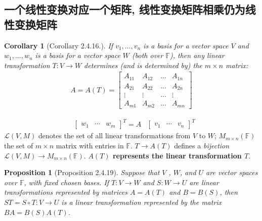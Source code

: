 \documentclass[11pt,a4paper]{article}
\newtheorem{proposition}{Proposition}
\newtheorem{corollary}{Corollary}
\begin{document}
\subsection{一个线性变换对应一个矩阵, 线性变换矩阵相乘仍为线性变换矩阵}
\begin{corollary}[Corollary 2.4.16.]
    If $v_1,...,v_n$ is a basis for a vector space $V$ and $w_1,...,w_n$ is a basis for a vector space $W$ (both over $\mathbb{F}$), then any linear transformation $T : V \rightarrow W$ determines (and is determined by) the $m\times n$ matrix:
    \begin{equation}
        \begin{aligned}
            A=A(T)=\begin{bmatrix}
                A_{11}&	A_{12}&... &A_{1n}\\
                A_{21}&	A_{22}&... &A_{2n}\\
                \vdots&	\vdots&... &\vdots\\
                A_{m1}&	A_{m2}&... &A_{mn}
            \end{bmatrix}
        \end{aligned}
        \nonumber
    \end{equation}
\end{corollary}
\begin{equation}
    \begin{aligned}
        &\begin{bmatrix}
            w_1&\cdots	&w_m
        \end{bmatrix}^T=A
        &\begin{bmatrix}
                v_1&\cdots	&v_n
        \end{bmatrix}^T
    \end{aligned}
    \nonumber
\end{equation}
$\mathcal{L} (V,M)$ denotes the set of all linear transformations from $V$ to $W$; $M_{m\times n}(\mathbb{F})$ the set of $m\times n$ matrix with entries in $\mathbb{F}$. $T\rightarrow A(T)$ defines a \textit{bijection} $\mathcal{L} (V,M)\rightarrow M_{m\times n}(\mathbb{F})$. \textbf{$A(T)$ represents the linear transformation $T$}.


\begin{proposition}[Proposition 2.4.19]
    Suppose that $V$ , $W$, and $U$ are vector spaces over $\mathbb{F}$, with fixed chosen bases. If
    $T : V \rightarrow W$ and $S : W \rightarrow U$ are linear transformations represented by matrices $A = A(T)$ and $B = B(S)$,
    then $ST = S \circ T : V \rightarrow U$ is a linear transformation represented by the matrix $BA = B(S)A(T)$.
\end{proposition}
\end{document}
